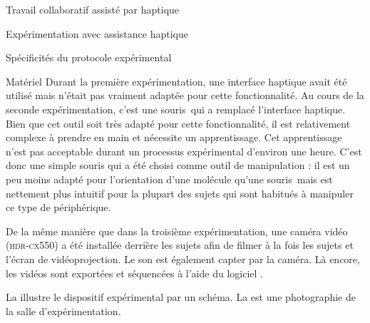 \documentclass[myfrancais]{mythesis}
\begin{document}
\begin{mychapter}{Travail collaboratif assisté par haptique}
\begin{mysection}{Expérimentation avec assistance haptique}
\begin{mysubsection}{Spécificités du protocole expérimental}
\begin{mysubsubsection}{Matériel}
					Durant la première expérimentation, une interface haptique avait été utilisé mais n'était pas vraiment adaptée pour cette fonctionnalité.
					Au cours de la seconde expérimentation, c'est une souris~\myThreeD qui a remplacé l'interface haptique.
					Bien que cet outil soit très adapté pour cette fonctionnalité, il est relativement complexe à prendre en main et nécessite un apprentissage.
					Cet apprentissage n'est pas acceptable durant un processus expérimental d'environ une heure.
					C'est donc une simple souris \myUSB qui a été choisi comme outil de manipulation : il est un peu moins adapté pour l'orientation d'une molécule qu'une souris~\myThreeD mais est nettement plus intuitif pour la plupart des sujets qui sont habitués à manipuler ce type de périphérique.

					De la même manière que dans la troisième expérimentation, une caméra vidéo \mySony (\textsc{hdr-cx550}) a été installée derrière les sujets afin de filmer à la fois les sujets et l'écran de vidéoprojection.
					Le son est également capter par la caméra.
					Là encore, les vidéos sont exportées et séquencées \myafortiori à l'aide du logiciel \myiMovie.

					La  illustre le dispositif expérimental par un schéma.
					La  est une photographie de la salle d'expérimentation.


\end{mysubsubsection}
\end{mysubsection}
\end{mysection}
\end{mychapter}
\end{document}
